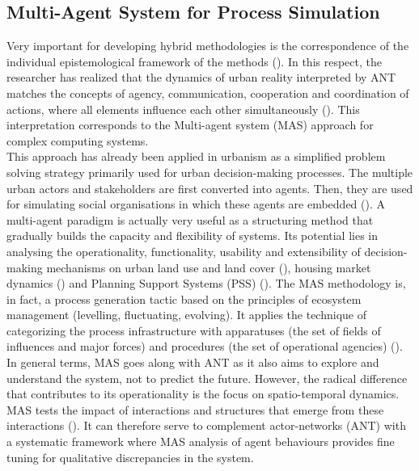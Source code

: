 \documentclass[11pt]{report}
\begin{document}
{{{{\subsection{Multi-Agent System for Process Simulation}

Very important for developing hybrid methodologies is the correspondence of the individual epistemological framework of the methods (\cite{mixed method}). In this respect, the researcher has realized that the dynamics of urban reality interpreted by ANT matches the concepts of agency, communication, cooperation and coordination of actions, where all elements influence each other simultaneously (\href{Ferber}{\citealt{ferber_multi-agent_1999}}).
This interpretation corresponds to the Multi-agent system (MAS) approach for complex computing systems.
\\

This approach has already been applied in urbanism as a simplified problem solving strategy primarily used for urban decision-making processes. The multiple urban actors and stakeholders are first converted into agents. Then, they are used for simulating social organisations in which these agents are embedded (\href{Bousquet}{\citealt{bousquet_multi-agent_2004}}). A multi-agent paradigm is actually very useful as a structuring method that gradually builds the capacity and flexibility of systems.
Its potential lies in analysing the operationality, functionality, usability and extensibility of decision-making mechanisms on urban land use and land cover (\href{Brown}{\citealt{brown_path_2005}}), housing market dynamics (\href{Diappi}{\citealt{diappi_smiths_2008}}) and Planning Support Systems (PSS) (\href{Saarloos}{\citealt{saarloos_multi-agent_2008}}). The MAS methodology is, in fact, a process generation tactic based on the principles of  ecosystem management (levelling, fluctuating, evolving). It applies the technique of categorizing the process infrastructure with apparatuses (the set of fields of influences and major forces) and procedures (the set of operational agencies)  (\href{Bousquet}{\citealt{bousquet_multi-agent_2004}}).
\\

In general terms, MAS goes along with ANT as it also aims to explore and understand the system, not to predict the future.
However, the radical difference that contributes to its operationality is the focus on spatio-temporal dynamics. MAS tests the impact of interactions and structures that emerge from these interactions (\href{Crooks}{\citealt{crooks_multi-agent_2014}}). It can therefore serve to complement actor-networks (ANT) with a systematic framework where MAS analysis of agent behaviours provides fine tuning for qualitative discrepancies in the system. 
\\

}}}}
\end{document}
